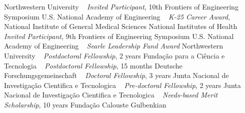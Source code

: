 Northwestern University
\newline
~
\Gap
{}
\textit{Invited Participant}, 10th Frontiers of Engineering Symposium 
\newline
U.S. National Academy of Engineering
\newline
~
\Gap
{}
\textit{K-25 Career Award}, National Institute of General Medical Sciences 
\newline
National Institutes of Health
\newline
~
\Gap
{}
\textit{Invited Participant}, 9th Frontiers of Engineering Symposium 
\newline
U.S. National Academy of Engineering
\newline
~
\Gap
{}
\textit{Searle Leadership Fund Award}
\newline
Northwestern University
\newline
~
\Gap
{}
\textit{Postdoctoral Fellowship}, 2 years 
\newline
Funda\c{c}\~ao para a Ci\^encia e Tecnologia
\newline
~
\Gap
{}
\textit{Postdoctoral Fellowship}, 15 months 
\newline
Deutsche Forschungsgemeinschaft 
\newline
~
\Gap
{}
\textit{Doctoral Fellowship}, 3 years 
\newline
Junta Nacional de Investiga\c{c}\~ao Cientifica e Tecnologica 
\newline
~
\Gap
{}
\textit{Pre-doctoral Fellowship}, 2 years 
\newline
Junta Nacional de Investiga\c{c}\~ao Cientifica e Tecnologica 
\newline
~
\Gap
{}
\textit{Needs-based Merit Scholarship}, 10 years 
\newline
Funda\c{c}\~ao Calouste Gulbenkian
\newline
~
\Gap
\vspace*{0.2cm}